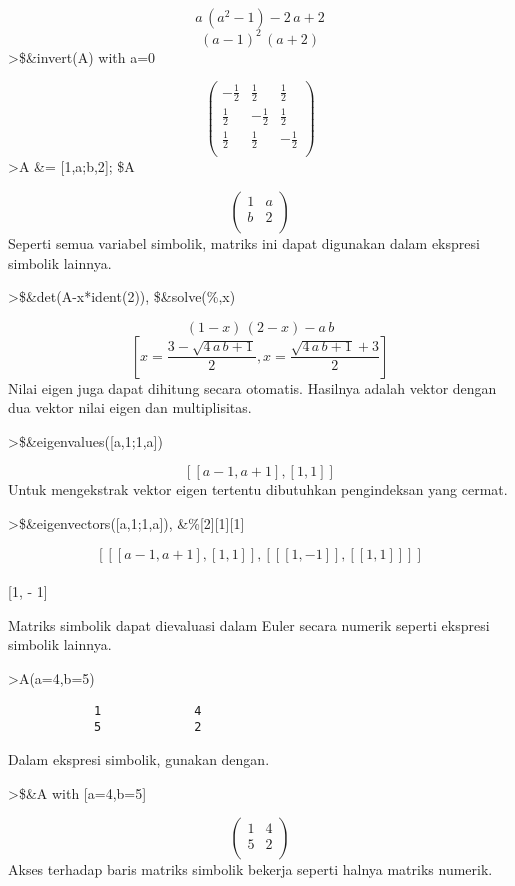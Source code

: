\documentclass[
]{book}
\begin{document}
\[a\,\left(a^2-1\right)-2\,a+2\] \[\left(a-1\right)^2\,\left(a+2\right)\]\textgreater\$\&invert(A) with a=0

\[\begin{pmatrix}-\frac{1}{2} & \frac{1}{2} & \frac{1}{2} \\ \frac{1 }{2} & -\frac{1}{2} & \frac{1}{2} \\ \frac{1}{2} & \frac{1}{2} & -\frac{1}{2} \\ \end{pmatrix}\]\textgreater A \&= {[}1,a;b,2{]}; \$A

\[\begin{pmatrix}1 & a \\ b & 2 \\ \end{pmatrix}\]Seperti semua variabel simbolik, matriks ini dapat digunakan dalam ekspresi simbolik lainnya.

\textgreater\$\&det(A-x*ident(2)), \$\&solve(\%,x)

\[\left(1-x\right)\,\left(2-x\right)-a\,b\] \[\left[ x=\frac{3-\sqrt{4\,a\,b+1}}{2} , x=\frac{\sqrt{4\,a\,b+1}+3}{2} \right]\] Nilai eigen juga dapat dihitung secara otomatis. Hasilnya adalah vektor dengan dua vektor nilai eigen dan multiplisitas.

\textgreater\$\&eigenvalues({[}a,1;1,a{]})

\[\left[ \left[ a-1 , a+1 \right]  , \left[ 1 , 1 \right]  \right]\]Untuk mengekstrak vektor eigen tertentu dibutuhkan pengindeksan yang cermat.

\textgreater\$\&eigenvectors({[}a,1;1,a{]}), \&\%{[}2{]}{[}1{]}{[}1{]}

\[\left[ \left[ \left[ a-1 , a+1 \right]  , \left[ 1 , 1 \right] \right]  , \left[ \left[ \left[ 1 , -1 \right]  \right]  , \left[ \left[ 1 , 1 \right]  \right]  \right]  \right]\]\\
{[}1, - 1{]}

Matriks simbolik dapat dievaluasi dalam Euler secara numerik seperti ekspresi simbolik lainnya.

\textgreater A(a=4,b=5)

\begin{verbatim}
            1             4 
            5             2 
\end{verbatim}

Dalam ekspresi simbolik, gunakan dengan.

\textgreater\$\&A with {[}a=4,b=5{]}

\[\begin{pmatrix}1 & 4 \\ 5 & 2 \\ \end{pmatrix}\]Akses terhadap baris matriks simbolik bekerja seperti halnya matriks numerik.
\end{document}
